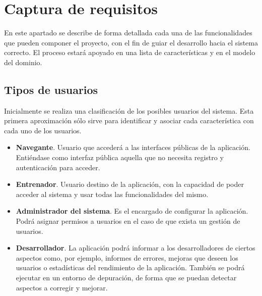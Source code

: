 %
%

\chapter{Captura de requisitos} %
\label{cha:captura_de_requisitos}
	
	En este apartado se describe de forma detallada cada una de las funcionalidades que pueden componer el proyecto, con el fin de guiar el desarrollo hacia el sistema correcto. El proceso estará apoyado en una lista de características y en el modelo del dominio.

% 
%
\section{Tipos de usuarios} %
	\label{sec:tipos_de_usuarios}
	
	Inicialmente se realiza una clasificación de los posibles usuarios del sistema. Esta primera aproximación sólo sirve para identificar y asociar cada característica con cada uno de los usuarios.

	\begin{itemize}
		\item {{\bf Navegante}. Usuario que accederá a las interfaces públicas de la aplicación. Entiéndase como interfaz pública aquella que no necesita registro y autenticación para acceder.}
		\item {{\bf Entrenador}. Usuario destino de la aplicación, con la capacidad de poder acceder al sistema y usar todas las funcionalidades del mismo.}
		\item {{\bf Administrador del sistema}. Es el encargado de configurar la aplicación. Podrá asignar permisos a usuarios en el caso de que exista un gestión de usuarios.}
		\item {{\bf Desarrollador}. La aplicación podrá informar a los desarrolladores de ciertos aspectos como, por ejemplo, informes de errores, mejoras que deseen los usuarios o estadísticas del rendimiento de la aplicación. También se podrá ejecutar en un entorno de depuración, de forma que se puedan detectar aspectos a corregir y mejorar.}
	\end{itemize}

